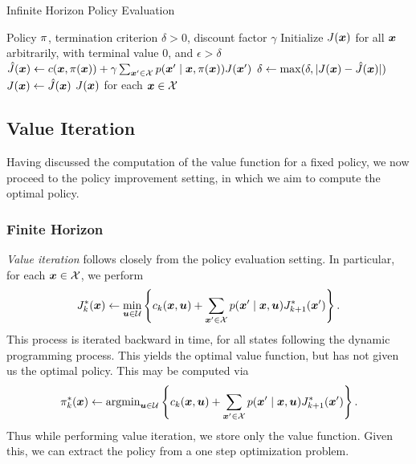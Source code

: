 \begin{algorithm}[t]
\caption{Infinite Horizon Policy Evaluation}
\centering
\label{alg:PE}

\begin{algorithmic}[1]
    \Require Policy $\pi$, termination criterion $\delta>0$, discount factor $\gamma$
    \State Initialize $J(\bm{x})$ for all $\bm{x}$ arbitrarily, with terminal value $0$, and $\epsilon>\delta$
    \While{$\epsilon > \delta$}
            \State $\hat{J}(\bm{x}) \gets c(\bm{x}, \pi(\bm{x})) + \gamma \sum_{\bm{x}' \in \mathcal{X}} p(\bm{x}' \mid \bm{x}, \pi(\bm{x})) J(\bm{x}')$
            \State $\delta \gets \max(\delta, |J(\bm{x}) - \hat{J}(\bm{x})|)$
            \State $J(\bm{x}) \gets \hat{J}(\bm{x})$
        \EndFor
    \EndWhile
    \State \Return $J(\bm{x})$ for each $\bm{x} \in \mathcal{X}$ 
\end{algorithmic}
\end{algorithm}


\subsection{Value Iteration}

Having discussed the computation of the value function for a fixed policy, we now proceed to the policy improvement setting, in which we aim to compute the optimal policy. 

\subsubsection{Finite Horizon} 
\textit{Value iteration} follows closely from the policy evaluation setting. In particular, for each $\bm{x} \in \mathcal{X}$, we perform
\begin{equation}
    J^*_k(\bm{x}) \gets \min_{\bm{u} \in \mathcal{U}} \left\{c_k(\bm{x}, \bm{u}) + \sum_{\bm{x}' \in \mathcal{X}} p(\bm{x}' \mid \bm{x}, \bm{u}) J^*_{k+1}(\bm{x}') \right\}. \label{eq:value_itr}
\end{equation}
This process is iterated backward in time, for all states following the dynamic programming process. This yields the optimal value function, but has not given us the optimal policy. This may be computed via 
\begin{equation}
    \pi^*_k(\bm{x}) \gets \text{argmin}_{\bm{u} \in \mathcal{U}} \left\{c_k(\bm{x}, \bm{u}) + \sum_{\bm{x}' \in \mathcal{X}} p(\bm{x}' \mid \bm{x}, \bm{u}) J^*_{k+1}(\bm{x}') \right\}. 
\end{equation}
Thus while performing value iteration, we store only the value function. Given this, we can extract the policy from a one step optimization problem. 

